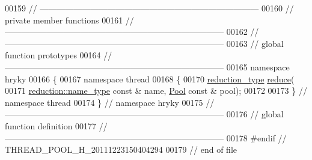\begin{DoxyCode}
00159 \textcolor{comment}{//
      ------------------------------------------------------------------------------}
00160 \textcolor{comment}{// private member functions}
00161 \textcolor{comment}{//
      ------------------------------------------------------------------------------}
00162 \textcolor{comment}{//
      ------------------------------------------------------------------------------}
00163 \textcolor{comment}{// global function prototypes}
00164 \textcolor{comment}{//
      ------------------------------------------------------------------------------}
00165 \textcolor{keyword}{namespace }hryky
00166 \{
00167 \textcolor{keyword}{namespace }thread
00168 \{
00170     \hyperlink{classhryky_1_1_intrusive_ptr}{reduction_type} \hyperlink{namespacehryky_1_1thread_aed5a09e1236726d3b2a02cff74f53524}{reduce}(
00171         \hyperlink{classhryky_1_1reduction_1_1_string}{reduction::name_type} \textcolor{keyword}{const} & name, \hyperlink{classhryky_1_1thread_1_1_pool}{Pool} \textcolor{keyword}{const} & pool);
00172 
00173 \} \textcolor{comment}{// namespace thread}
00174 \} \textcolor{comment}{// namespace hryky}
00175 \textcolor{comment}{//
      ------------------------------------------------------------------------------}
00176 \textcolor{comment}{// global function definition}
00177 \textcolor{comment}{//
      ------------------------------------------------------------------------------}
00178 \textcolor{preprocessor}{#endif // THREAD\_POOL\_H\_20111223150404294}
00179 \textcolor{preprocessor}{}\textcolor{comment}{// end of file}
\end{DoxyCode}
